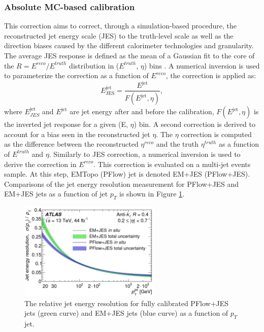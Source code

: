 \subsubsection{Absolute MC-based calibration}
\label{Jet:Cal:chain:JES}
This correction aims to correct, through a simulation-based procedure, the reconstructed jet energy scale (JES) to the truth-level scale as well as the direction biases caused by the different calorimeter technologies and granularity. The average JES response is defined as the mean of a Gaussian fit to the core of the $R=E^{reco}/E^{truth}$ distribution in ($E^{truth}$, $\eta$) bins \cite{Old_JES, Old_JES_Sys}. A numerical inversion is used to parameterize the correction as a function of $E^{reco}$, the correction is applied as: 
\begin{equation}
    E_{\text{JES}}^{\mathrm{jet}}=\frac{E^{\mathrm{jet}}}{F(E^{\mathrm{jet}},\eta)},
\end{equation}
where $E_{JES}^{\mathrm{jet}}$ and $E^{\mathrm{jet}}$ are jet energy after and before the  calibration, $F(E^{\mathrm{jet}}, \eta)$ is the inverted jet response for a given (E, $\eta$) bin. A second correction is derived to account for a bias seen in the reconstructed jet $\eta$. The $\eta$ correction is computed as the difference between the reconstructed $\eta^{reco}$ and the truth $\eta^{truth}$ as a function of $E^{truth}$ and $\eta$. Similarly to JES correction, a numerical inversion is used to derive the correction in $E^{reco}$. This correction is evaluated on a multi-jet events sample. At this step, EMTopo (PFlow) jet is denoted EM+JES (PFlow+JES). Comparisons of the jet energy resolution measurement for PFlow+JES and EM+JES jets as a function of jet $p_T$ is shown in Figure \ref{fig:Jet:Cal:chain:JER}.
\begin{figure}[htbp]
    \centering
    \includegraphics[width=0.6\textwidth]{Ch4/Img/Jet_Resolution_Topo_vs_PFlow.png}
    \caption{The relative jet energy resolution for fully calibrated PFlow+JES jets (green curve) and EM+JES jets (blue curve) as a function of $p_T$ jet.}
    \label{fig:Jet:Cal:chain:JER}
\end{figure}

